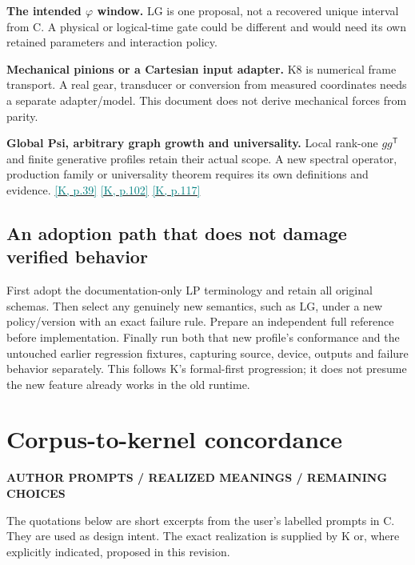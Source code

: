 \documentclass[11pt,a4paper]{article}
\newcommand{\kref}[1]{\hyperlink{baseline.#1}{\textcolor{teal}{[K, p.#1]}}}
\newcommand{\status}[1]{{\sffamily\bfseries\scriptsize\color{teal}#1}\par}
\newcommand{\sectionstart}[1]{\par\addvspace{18pt}\Needspace{12\baselineskip}\section{#1}}
\theoremstyle{lpstyle}
\begin{document}
\textbf{The intended $\varphi$ window.} LG is one proposal, not a recovered unique interval from C. A physical or logical-time gate could be different and would need its own retained parameters and interaction policy.

\textbf{Mechanical pinions or a Cartesian input adapter.} K8 is numerical frame transport. A real gear, transducer or conversion from measured coordinates needs a separate adapter/model. This document does not derive mechanical forces from parity.

\textbf{Global Psi, arbitrary graph growth and universality.} Local rank-one $gg^{\mathsf T}$ and finite generative profiles retain their actual scope. A new spectral operator, production family or universality theorem requires its own definitions and evidence. \kref{39} \kref{102} \kref{117}

\subsection{An adoption path that does not damage verified behavior}
First adopt the documentation-only LP terminology and retain all original schemas. Then select any genuinely new semantics, such as LG, under a new policy/version with an exact failure rule. Prepare an independent full reference before implementation. Finally run both that new profile's conformance and the untouched earlier regression fixtures, capturing source, device, outputs and failure behavior separately. This follows K's formal-first progression; it does not presume the new feature already works in the old runtime.

\sectionstart{Corpus-to-kernel concordance}
\status{AUTHOR PROMPTS / REALIZED MEANINGS / REMAINING CHOICES}
The quotations below are short excerpts from the user's labelled prompts in C. They are used as design intent. The exact realization is supplied by K or, where explicitly indicated, proposed in this revision.
\end{document}
